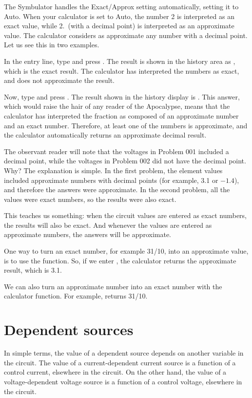 The Symbulator handles the Exact/Approx setting automatically,
setting it to Auto. When your calculator is set to Auto, the number
2 is interpreted as an exact value, while 2.\ (with a decimal point)
is interpreted as an approximate value. The calculator considers as
approximate any number with a decimal point. Let us see this in two
examples.

In the entry line, type  and press . The result
is shown in the history area as , which is the exact
result. The calculator has interpreted the numbers as exact, and
does not approximate the result.

Now, type  and press . The result shown in the
history display is . This answer, which would raise
the hair of any reader of the Apocalypse, means that the calculator
has interpreted the fraction as composed of an approximate number
and an exact number. Therefore, at least one of the numbers is
approximate, and the calculator automatically returns an approximate
decimal result.

The observant reader will note that the voltages in Problem 001
included a decimal point, while the voltages in Problem 002 did not
have the decimal point. Why? The explanation is simple. In the first
problem, the element values included approximate numbers with
decimal points (for example, 3.1 or $-1.4$), and therefore the
answers were approximate. In the second problem, all the values were
exact numbers, so the results were also exact.

This teaches us something: when the circuit values are entered as
exact numbers, the results will also be exact. And whenever the
values are entered as approximate numbers, the answers will be
approximate.

One way to turn an exact number, for example 31/10, into an
approximate value, is to use the  function. So, if we
enter , the calculator returns the approximate
result, which is 3.1.

We can also turn an approximate number into an exact number with the
 calculator function. For example, 
returns 31/10.

\section{Dependent sources}

In simple terms, the value of a dependent source depends on another
variable in the circuit. The value of a current-dependent current
source is a function of a control current, elsewhere in the circuit.
On the other hand, the value of a voltage-dependent voltage source
is a function of a control voltage, elsewhere in the circuit.

